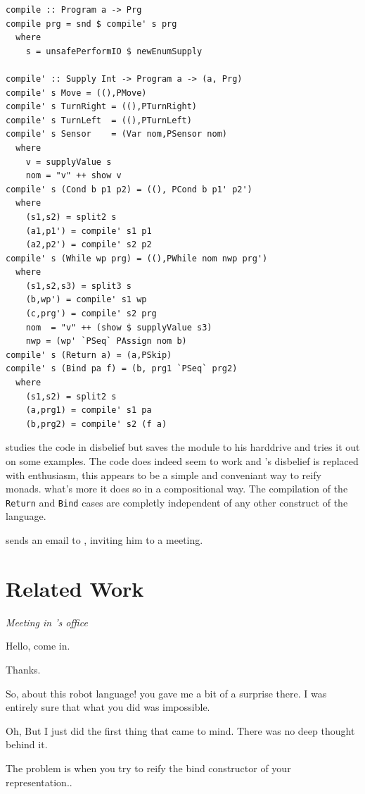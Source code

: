 \begin{small} 
\begin{verbatim}
compile :: Program a -> Prg
compile prg = snd $ compile' s prg 
  where 
    s = unsafePerformIO $ newEnumSupply
    
compile' :: Supply Int -> Program a -> (a, Prg) 
compile' s Move = ((),PMove)
compile' s TurnRight = ((),PTurnRight)
compile' s TurnLeft  = ((),PTurnLeft)
compile' s Sensor    = (Var nom,PSensor nom)
  where
    v = supplyValue s
    nom = "v" ++ show v 
compile' s (Cond b p1 p2) = ((), PCond b p1' p2') 
  where
    (s1,s2) = split2 s
    (a1,p1') = compile' s1 p1
    (a2,p2') = compile' s2 p2 
compile' s (While wp prg) = ((),PWhile nom nwp prg') 
  where
    (s1,s2,s3) = split3 s
    (b,wp') = compile' s1 wp
    (c,prg') = compile' s2 prg 
    nom  = "v" ++ (show $ supplyValue s3)
    nwp = (wp' `PSeq` PAssign nom b) 
compile' s (Return a) = (a,PSkip)
compile' s (Bind pa f) = (b, prg1 `PSeq` prg2) 
  where
    (s1,s2) = split2 s
    (a,prg1) = compile' s1 pa
    (b,prg2) = compile' s2 (f a) 
\end{verbatim}
\end{small}

\docname{} studies the code in disbelief but saves the module to his harddrive 
and tries it out on some examples. The code does indeed seem to work and 
\docname{}'s disbelief is replaced with enthusiasm, this appears to be a simple 
and conveniant way to reify monads. what's more it does so in a 
compositional way. The compilation of the {\tt Return} and {\tt Bind} cases 
are completly independent of any other construct of the language. 

\docname{} sends an email to \studname{}, inviting him to a meeting. 

\section{Related Work} 
\emph{Meeting in \docname{}'s office} \newline 


\begin{dialogue} 

\speak{\docname{}} Hello, come in. 

\speak{\studname{}} Thanks. 

\speak{\docname{}} So, about this robot language! you gave me a bit of a 
surprise there. I was entirely sure that what you did was impossible. 

\speak{\studname{}} Oh, But I just did the first thing that came to mind. 
There was no deep thought behind it. 

\speak{\docname{}} The problem is 
 when you try to reify the bind constructor of your representation..
\end{dialogue} 


